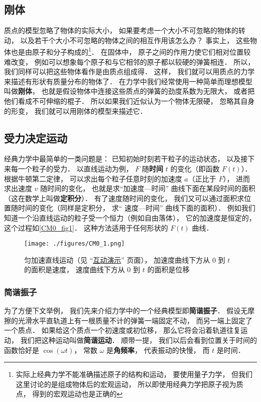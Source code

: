 \subsection{刚体}
质点的模型忽略了物体的实际大小， 如果要考虑一个大小不可忽略的物体的转动， 以及若干个大小不可忽略的物体之间的相互作用该怎么办？ 事实上， 这些物体也是由原子和分子构成的\footnote{实际上经典力学不能准确描述原子的结构和运动， 要使用量子力学， 但我们这里讨论的是组成物体后的宏观运动， 所以即使用经典力学把原子视为质点， 得到的宏观运动也是正确的}． 在固体中， 原子之间的作用力使它们相对位置较难改变， 例如可以想象每个原子和与它相邻的原子都以较硬的弹簧相连． 所以， 我们同样可以把这些物体看作是由质点组成得． 这样， 我们就可以用质点的力学来描述有形状有质量分布的物体了． 在力学中我们经常使用一种简单而理想模型叫做\textbf{刚体}， 也就是假设物体中连接这些质点的弹簧的劲度系数为无限大， 或者把他们看成不可伸缩的棍子． 所以如果我们近似认为一个物体无限硬， 忽略其自身的形变， 我们就可以用刚体的模型来描述它．

\subsection{受力决定运动}
经典力学中最简单的一类问题是： 已知初始时刻若干粒子的运动状态， 以及接下来每一个粒子的受力． 以直线运动为例， $F$ 随\textbf{时间} $t$ 的变化（即函数 $F(t)$）． 根据牛顿第二定律， 可以求出每个粒子任意时刻的加速度 $a$（正比于 $F$）， 进而求出速度 $v$ 随时间的变化， 也就是求“加速度—时间” 曲线下面在某段时间的面积（这在数学上叫做\textbf{定积分}）． 有了速度随时间的变化， 我们又可以通过面积求位置随时间的变化（同样是定积分， 求“ 速度—时间” 曲线下面的面积）． 例如我们知道一个沿直线运动的粒子受一个恒力（例如自由落体）， 它的加速度是恒定的， 这个过程如\autoref{CM0_fig1}． 这种方法适用于任何形状的 $F(t)$ 曲线．

\begin{figure}[ht]
\centering
\texttt{[image: ./figures/CM0\_1.png]}
\caption{匀加速直线运动（见 “\href{https://wuli.wiki/apps/consta.html}{互动演示}” 页面）， 加速度曲线下方从 $0$ 到 $t$ 的面积是速度， 速度曲线下方从 $0$ 到 $t$ 的面积是位移} \label{CM0_fig1}
\end{figure}

\subsubsection{简谐振子}
为了方便下文举例， 我们先来介绍力学中的一个经典模型即\textbf{简谐振子}． 假设无摩擦的光滑水平直轨道上有一根质量不计的弹簧一端固定不动， 而另一端上固定了一个质点． 如果给这个质点一个初速度或初位移， 那么它将会沿着轨道往复运动， 我们把这种运动叫做\textbf{简谐运动}． 顺带一提， 我们以后会看到位置关于时间的函数恰好是 $\cos(\omega t)$， 常数 $\omega$ 是\textbf{角频率}， 代表振动的快慢， 而 $t$ 是时间．

